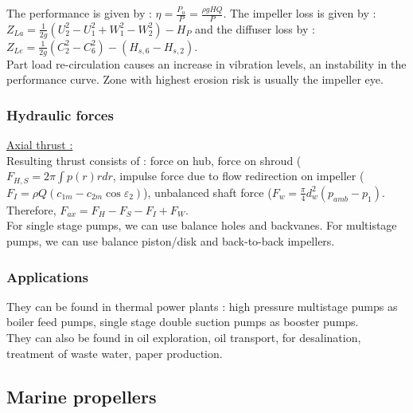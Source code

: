 \documentclass[../main.tex]{subfiles}
\begin{document}
The performance is given by : $\eta = \frac{P_u}{P} = \frac{\rho g H Q}{P}$. The impeller loss is given by : $Z_{La} = \frac{1}{2g}(U_2^2 - U_1^2 + W_1^2 - W_2^2) - H_P$ and the diffuser loss by : $Z_{Le} = \frac{1}{2g} (C_2^2-C_6^2)-(H_{s,6}-H_{s,2})$.\\

Part load re-circulation causes an increase in vibration levels, an instability in the performance curve. Zone with highest erosion risk is usually the impeller eye. 

\subsubsection{Hydraulic forces}

\quad \underline{Axial thrust :}\\
Resulting thrust consists of : force on hub, force on shroud ($F_{H,S} = 2\pi \int p(r)rdr$, impulse force due to flow redirection on impeller ($F_I = \rho Q (c_{1m} - c_{2m} \cos \varepsilon_2)$), unbalanced shaft force ($F_w = \frac{\pi}{4} d_w^2 (p_{amb} - p_1)$. Therefore, $F_{ax} = F_H - F_S - F_I + F_W$.\\

For single stage pumps, we can use balance holes and backvanes. For multistage pumps, we can use balance piston/disk and back-to-back impellers. 

\subsubsection{Applications}
They can be found in thermal power plants : high pressure multistage pumps as boiler feed pumps, single stage double suction pumps as booster pumps.\\
They can also be found in oil exploration, oil transport, for desalination, treatment of waste water, paper production.\\

\subsection{Marine propellers}
\end{document}
